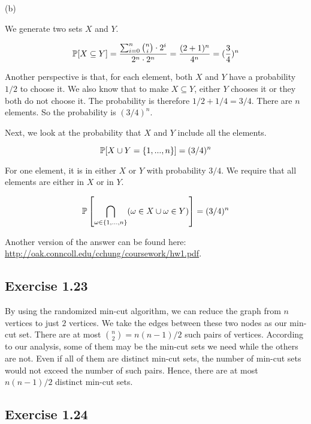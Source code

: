 \noindent (b) 

We generate two sets $X$ and $Y$.

\begin{equation*}
\P[X \subseteq Y] = \frac{\sum_{i=0}^{n} \binom{n}{i} \cdot 2^{i}}{2^n \cdot 2^{n}} = \frac{(2+1)^n}{4^n} = (\frac{3}{4})^n
\end{equation*}

Another perspective is that, for each element, both $X$ and $Y$ have a probability $1/2$ to choose it. We also
know that to make $X \subseteq Y$, either $Y$ chooses it or they both do not choose it. The probability is therefore
$1/2 + 1/4 = 3/4$. There are $n$ elements. So the probability is $(3/4)^n$.

Next, we look at the probability that $X$ and $Y$ include all the elements.

\begin{equation*}
\P[X \cup Y = \{1,...,n\}] = (3/4)^n
\end{equation*}

For one element, it is in either $X$ or $Y$ with probability $3/4$. We require that all elements are
either in $X$ or in $Y$.

\begin{equation*}
\P\left[\bigcap_{\omega \in \{1,...,n\}} (\omega \in X \cup \omega \in Y) \right] = (3/4)^n
\end{equation*}

Another version of the answer can be found here: \url{http://oak.conncoll.edu/cchung/coursework/hw1.pdf}.

\subsection*{Exercise 1.23}

By using the randomized min-cut algorithm, we can reduce the graph from $n$ vertices to just $2$ vertices.
We take the edges between these two nodes as our min-cut set. There are at most $\binom{n}{2} = n(n-1)/2$
such pairs of vertices. According to our analysis, some of them may be the min-cut sets we need while the
others are not. Even if all of them are distinct min-cut sets, the number of min-cut sets would not exceed the number
of such pairs. Hence, there are at most $n(n-1)/2$ distinct min-cut sets.

\subsection*{Exercise 1.24}

